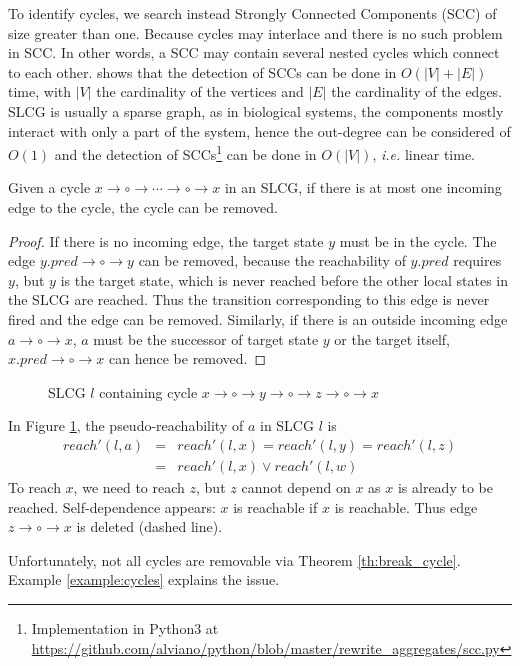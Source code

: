 To identify cycles, we search instead Strongly Connected Components (SCC) of size greater than one.
Because cycles may interlace and there is no such problem in SCC.
In other words, a SCC may contain several nested cycles which connect to each other.
\cite{tarjan1972} shows that the detection of SCCs can be done in $O (|V|+|E|)$ time, with $|V|$ the cardinality of the vertices and $|E|$ the cardinality of the edges.
SLCG is usually a sparse graph, as in biological systems, the components mostly interact with only a part of the system, hence the out-degree can be considered of $O (1)$ and the detection of SCCs\footnote{Implementation in Python3 at \url{https://github.com/alviano/python/blob/master/rewrite_aggregates/scc.py}} can be done in $O(|V|)$, \textit{i.e.} linear time.

\begin{theorem}\label{th:break_cycle}
Given a cycle $x\to \circ \to \cdots \to \circ \to x$ in an SLCG, if there is at most one incoming edge to the cycle, the cycle can be removed.
\end{theorem}

\begin{proof}
If there is no incoming edge, the target state $y$ must be in the cycle. 
The edge $y.pred\to\circ\to y$ can be removed, because the reachability of $y.pred$ requires $y$, but $y$ is the target state, which is never reached before the other local states in the SLCG are reached.
Thus the transition corresponding to this edge is never fired and the edge can be removed.
Similarly, if there is an outside incoming edge $a\to \circ \to x$, $a$ must be the successor of target state $y$ or the target itself, $x.pred\to\circ\to x$ can hence be removed.
\end{proof}

\begin{example}
    \begin{figure}[ht]
        \centering
        
        \caption[SLCG with cycles]{SLCG $l$ containing cycle $x\to \circ \to y \to \circ \to z\to \circ \to x$}
        \label{cycle1}
    \end{figure}
    
    In Figure \ref{cycle1}, the pseudo-reachability of $a$ in SLCG $l$ is 
    \begin{eqnarray*}
       reach'(l,a)&=&reach'(l,x)=reach'(l,y)=reach'(l,z)    \\
         &=&reach'(l,x)\lor reach'(l,w)
    \end{eqnarray*}
    To reach $x$, we need to reach $z$, but $z$ cannot depend on $x$ as $x$ is already to be reached. 
    Self-dependence appears: $x$ is reachable if $x$ is reachable.
    Thus edge $z\to \circ \to x$ is deleted (dashed line).
\end{example}
Unfortunately, not all cycles are removable via Theorem \ref{th:break_cycle}. Example \ref{example:cycles} explains the issue.

